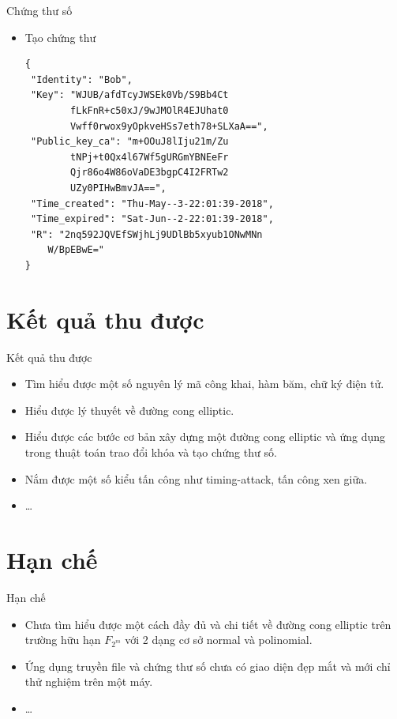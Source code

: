 \documentclass[compress]{beamer}
\begin{document}
\begin{frame}[fragile]{Chứng thư số}
\begin{itemize}
\item Tạo chứng thư
\begin{lstlisting}
{
 "Identity": "Bob",
 "Key": "WJUB/afdTcyJWSEk0Vb/S9Bb4Ct
 		fLkFnR+c50xJ/9wJMOlR4EJUhat0
 		Vwff0rwox9yOpkveHSs7eth78+SLXaA==",
 "Public_key_ca": "m+OOuJ8lIju21m/Zu
 		tNPj+t0Qx4l67Wf5gURGmYBNEeFr
 		Qjr86o4W86oVaDE3bgpC4I2FRTw2
 		UZy0PIHwBmvJA==",
 "Time_created": "Thu-May--3-22:01:39-2018",
 "Time_expired": "Sat-Jun--2-22:01:39-2018",
 "R": "2nq592JQVEfSWjhLj9UDlBb5xyub1ONwMNn
 	W/BpEBwE="
}
\end{lstlisting}
\end{itemize}
\end{frame}
\section*{Kết quả thu được}
\begin{frame}{Kết quả thu được}
\begin{itemize}
\item Tìm hiểu được một số nguyên lý mã công khai, hàm băm, chữ ký điện tử.
\item Hiểu được lý thuyết về đường cong elliptic.
\item Hiểu được các bước cơ bản xây dựng một đường cong elliptic và ứng dụng trong thuật toán trao đổi khóa và tạo chứng thư số.
\item Nắm được một số kiểu tấn công như timing-attack, tấn công xen giữa.
\item \ldots
\end{itemize}
\end{frame}
\section*{Hạn chế}
\begin{frame}{Hạn chế}
\begin{itemize}
\item Chưa tìm hiểu được một cách đầy đủ và chi tiết về đường cong elliptic trên trường hữu hạn $F_{2^m}$ với 2 dạng cơ sở normal và polinomial.
\item Ứng dụng truyền file và chứng thư số chưa có giao diện đẹp mắt và mới chỉ thử nghiệm trên một máy.
\item \ldots
\end{itemize}
\end{frame}
\end{document}
